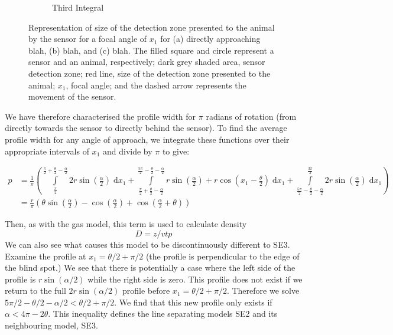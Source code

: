 \documentclass[a4paper,10pt,reqno,oneside]{amsart}
\begin{document}
\begin{figure}[t]
\begin{subfigure}[t]{0.45\textwidth}
                \caption{Third Integral}
                \label{f:thirdInt}
        \end{subfigure}%
\label{f:x1AndInt}
\caption{Representation of size of the detection zone presented to the animal by the sensor for a focal angle of $x_1$ for (a) directly approaching blah, (b) blah, and (c) blah. The filled square and circle represent a sensor and an animal, respectively; dark grey shaded area, sensor detection zone; red line, size of the detection zone presented to the animal; $x_1$, focal angle; and the dashed arrow represents the movement of the sensor.}
\end{figure}


We have therefore characterised the profile width for $\pi$ radians of rotation (from directly towards the sensor to directly behind the sensor). To find the average profile width for any angle of approach, we integrate these functions over their appropriate intervals of $x_1$ and divide by $\pi$ to give:

\begin{align}
    p &=\frac{1}{\pi} \left(\int\limits_{\frac{\pi}{2}}^{\frac{\pi}{2} + \frac{\theta}{2} - \frac{\alpha}{2}}2 r \sin{\left (\frac{\alpha}{2} \right )}\;\mathrm{d}x_1+\int\limits_{\frac{\pi}{2} + \frac{\theta}{2} - \frac{\alpha}{2}}^{\frac{5 \pi}{2} - \frac{\theta}{2} - \frac{\alpha}{2}}r \sin{\left (\frac{\alpha}{2} \right )} + r \cos{\left (x_1 - \frac{\theta}{2} \right )}\;\mathrm{d}x_1+\int\limits_{\frac{5 \pi}{2} - \frac{\theta}{2} - \frac{\alpha}{2}}^{\frac{3 \pi}{2}}2 r \sin{\left (\frac{\alpha}{2} \right )}\;\mathrm{d}x_1\right) \nonumber  \\
     &= \frac{r}{\pi} \left(\theta \sin{\left (\frac{\alpha}{2} \right )} - \cos{\left (\frac{\alpha}{2} \right )} + \cos{\left (\frac{\alpha}{2} + \theta \right )}\right) \label{e:p321}
\end{align}

Then, as with the gas model, this term is used to calculate density
\begin{equation}
\label{e:gas}
D = z/vtp
\end{equation}
We can also see what causes this model to be discontinuously different to SE3. Examine the profile at $x_1 = 	\theta/2 + \pi/2$ (the profile is perpendicular to the edge of the blind spot.) We see that there is potentially a case where the left side of the profile is $r\sin( \alpha/2)$ while the right side is zero. This profile does not exist if we return to the full $2r\sin( \alpha/2)$ profile before $x_1  = \theta/2 + \pi/2$. Therefore we solve $5\pi/2 - \theta/2 - \alpha/2 <  \theta/2 + \pi/2$. We find that this new profile only exists if $ \alpha < 4\pi - 2 \theta$. This inequality defines the line separating models SE2 and its neighbouring model, SE3.
\end{document}
